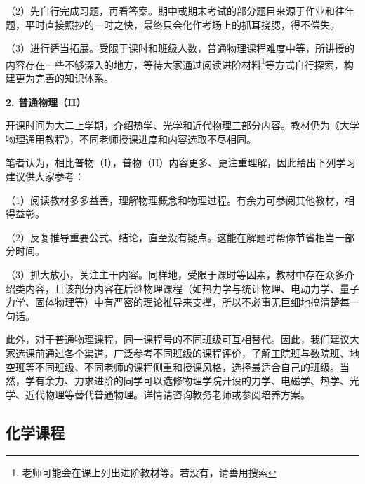 \documentclass[11pt,oneside]{book}
\begin{document}
\vspace{10pt}

（2）先自行完成习题，再看答案。期中或期末考试的部分题目来源于作业和往年题，平时直接照抄的一时之快，最终只会化作考场上的抓耳挠腮，得不偿失。

\vspace{10pt}

（3）进行适当拓展。受限于课时和班级人数，普通物理课程难度中等，所讲授的内容存在一些不够深入的地方，等待大家通过阅读进阶材料\footnote{老师可能会在课上列出进阶教材等。若没有，请善用搜索}等方式自行探索，构建更为完善的知识体系。

\vspace{10pt}

\textbf{2. 普通物理（II）}

开课时间为大二上学期，介绍热学、光学和近代物理三部分内容。教材仍为《大学物理通用教程》，不同老师授课进度和内容选取不尽相同。

\vspace{10pt}

笔者认为，相比普物（I），普物（II）内容更多、更注重理解，因此给出下列学习建议供大家参考：

\vspace{10pt}

（1）阅读教材多多益善，理解物理概念和物理过程。有余力可参阅其他教材，相得益彰。

\vspace{10pt}

（2）反复推导重要公式、结论，直至没有疑点。这能在解题时帮你节省相当一部分时间。

\vspace{10pt}

（3）抓大放小，关注主干内容。同样地，受限于课时等因素，教材中存在众多介绍类内容，且该部分内容在后继物理课程（如热力学与统计物理、电动力学、量子力学、固体物理等）中有严密的理论推导来支撑，所以不必事无巨细地搞清楚每一句话。

\vspace{10pt}

此外，对于普通物理课程，同一课程号的不同班级可互相替代。因此，我们建议大家选课前通过各个渠道，广泛参考不同班级的课程评价，了解工院班与数院班、地空班等不同班级、不同老师的课程侧重和授课风格，选择最适合自己的班级。当然，学有余力、力求进阶的同学可以选修物理学院开设的力学、电磁学、热学、光学、近代物理等替代普通物理。详情请咨询教务老师或参阅培养方案。

\subsection{化学课程}
\end{document}
